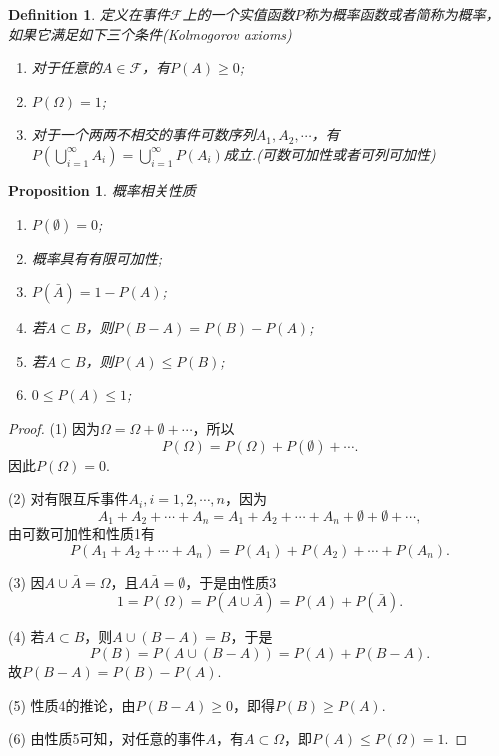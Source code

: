 \documentclass{article}
\newtheorem{proposition}[theorem]{Proposition}
\newtheorem{definition}[theorem]{Definition}
\begin{document}
\begin{definition}
\rm 定义在事件$\mathscr{F}$上的一个实值函数$P$称为{\color{red}概率函数}或者简称为概率，如果它满足如下三个条件(Kolmogorov axioms)
\begin{enumerate}
	\item 对于任意的$A \in \mathscr{F}$，有$P(A) \geq 0$;
	\item $P(\Omega) = 1$;
	\item 对于一个两两不相交的事件可数序列$A_1,A_2,\cdots$，有$P(\bigcup\limits_{i=1}^{\infty} A_i) = \bigcup\limits_{i=1}^{\infty}P(A_i)$成立.({\color{red}可数可加性或者可列可加性})
\end{enumerate}
\end{definition}


\begin{proposition}
\rm {\color{red}概率相关性质}
\begin{enumerate}
	\item $P(\emptyset) = 0$;
	\item 概率具有有限可加性;
	\item $P(\bar{A}) = 1 - P(A)$;
	\item 若$A \subset B$，则$P(B-A) = P(B) - P(A)$;
	\item 若$A\subset B$，则$P(A) \leq P(B)$;
	\item $0 \leq P(A) \leq 1$;
\end{enumerate}
\end{proposition}

\begin{proof}
(1) 因为$\Omega = \Omega + \emptyset + \cdots$，所以
$$
P(\Omega) = P(\Omega) + P(\emptyset) + \cdots.
$$
因此$P(\Omega) = 0$.

(2) 对有限互斥事件$A_i,i=1,2,\cdots,n$，因为
$$
A_1 + A_2 + \cdots + A_n = A_1 + A_2 + \cdots + A_n + \emptyset +\emptyset + \cdots,
$$
由可数可加性和性质1有
$$
P(A_1 + A_2 + \cdots + A_n) = P(A_1) + P(A_2) + \cdots + P(A_n). 
$$

(3)
因$A \cup \bar{A} = \Omega$，且$A\bar{A} = \emptyset$，于是由性质3
$$
1 = P(\Omega) = P(A \cup \bar{A}) = P(A) + P(\bar{A}).
$$

(4) 若$A \subset B$，则$A \cup (B-A) = B$，于是
$$
P(B) = P(A \cup (B-A)) = P(A) + P(B-A).
$$
故$P(B-A) = P(B) - P(A)$. 

(5) 性质4的推论，由$P(B-A) \geq 0$，即得$P(B) \geq P(A)$. 

(6) 由性质5可知，对任意的事件$A$，有$A \subset \Omega$，即$P(A) \leq P(\Omega) = 1$. 
\end{proof}
\end{document}
